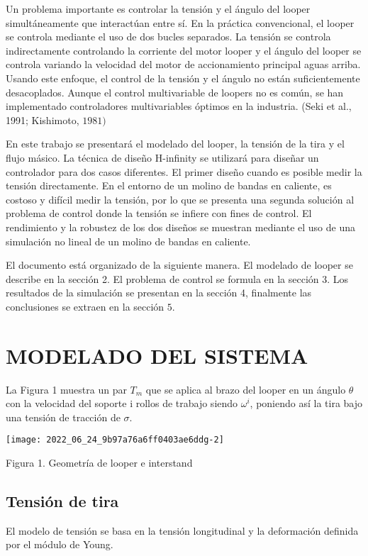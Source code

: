 Un problema importante es controlar la tensión y el ángulo del looper simultáneamente que interactúan entre sí. En la práctica convencional, el looper se controla mediante el uso de dos bucles separados. La tensión se controla indirectamente controlando la corriente del motor looper y el ángulo del looper se controla variando la velocidad del motor de accionamiento principal aguas arriba. Usando este enfoque, el control de la tensión y el ángulo no están suficientemente desacoplados. Aunque el control multivariable de loopers no es común, se han implementado controladores multivariables óptimos en la industria. (Seki et al., 1991; Kishimoto, $1981)$

En este trabajo se presentará el modelado del looper, la tensión de la tira y el flujo másico. La técnica de diseño H-infinity se utilizará para diseñar un controlador para dos casos diferentes. El primer diseño cuando es posible medir la tensión directamente. En el entorno de un molino de bandas en caliente, es costoso y difícil medir la tensión, por lo que se presenta una segunda solución al problema de control donde la tensión se infiere con fines de control. El rendimiento y la robustez de los dos diseños se muestran mediante el uso de una simulación no lineal de un molino de bandas en caliente.

El documento está organizado de la siguiente manera. El modelado de looper se describe en la sección 2. El problema de control se formula en la sección 3. Los resultados de la simulación se presentan en la sección 4, finalmente las conclusiones se extraen en la sección $5 .$

\section{MODELADO DEL SISTEMA}
La Figura 1 muestra un par $T_{m}$ que se aplica al brazo del looper en un ángulo $\theta$ con la velocidad del soporte $\mathrm{i}$ rollos de trabajo siendo $\omega^{i}$, poniendo así la tira bajo una tensión de tracción de $\sigma$.

\begin{center}
\texttt{[image: 2022\_06\_24\_9b97a76a6ff0403ae6ddg-2]}
\end{center}

Figura 1. Geometría de looper e interstand

\subsection{Tensión de tira}
El modelo de tensión se basa en la tensión longitudinal y la deformación definida por el módulo de Young.

